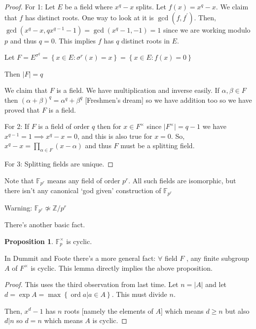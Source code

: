 \documentclass{article}
\theoremstyle{definition}
\newtheorem{proposition}{Proposition}
\begin{document}
\begin{proof}
    For 1: Let \(E\) be a field where \(x^q - x\) splits. Let \(f(x)=x^q - x\). We claim that \(f\) has distinct roots. One way to look at it is \(\gcd(f,f^{\prime})\). Then, \(\gcd(x^q - x, qx^{q-1} - 1 ) = \gcd(x^q - 1, -1 )=1\) since we are working modulo \(p\) and thus \(q=0\). This implies \(f\) has \(q\) distinct roots in \(E\).
    
    Let \(F=E^{\sigma^q}=\left\{ x\in E : \sigma ^r(x) = x \right\} = \left\{ x\in E:f(x)=0 \right\} \) 

    Then \(\vert F \vert = q\)
    
    We claim that \(F\) is a field. We have multiplication and inverse easily. If \(\alpha ,\beta \in F\) then \((\alpha +\beta )^q = \alpha ^q + \beta ^q\) [Freshmen's dream] so we have addition too so we have proved that \(F\) is a field.  

    For 2: If \(F\) is a field of order \(q\) then for \(x\in F^\times\) since \(\vert F^\times \vert = q-1\) we have \(x^{q-1} = 1 \implies x^q - x = 0 \), and this is also true for \(x=0\). So, \(x^q - x = \prod_{\alpha \in F}(x-\alpha)\) and thus \(F\) must be a splitting field. 

    For 3: Splitting fields are unique.

\end{proof}

Note that \(\mathbb{F}_{p^r}\) means any field of order \(p^r\). All such fields are isomorphic, but there isn't any canonical `god given' construction of \(\mathbb{F}_{p^r}\)  

Warning: \(\mathbb{F}_{p^r} \not\simeq \mathbb{Z} / p^r\) 

There's another basic fact.

\begin{proposition}
    \(\mathbb{F} _p^\times \) is cyclic.
\end{proposition}

In Dummit and Foote there's a more general fact: \(\forall\) field \(F\) , any finite subgroup \(A\) of \(F^\times \) is cyclic. This lemma directly implies the above proposition.

\begin{proof}
    This uses the third observation from last time. Let \(n = \vert A \vert\) and let \(d = \exp A = \max \left\{ \operatorname{ord} a | a\in A \right\} \). This must divide \(n\).

    Then, \(x^d - 1\) has \(n\) roots [namely the elements of \(A\)] which means \(d \geq n\) but also \(d \vert n\) so \(d=n\) which means \(A\) is cyclic.
    
\end{proof}
\end{document}
